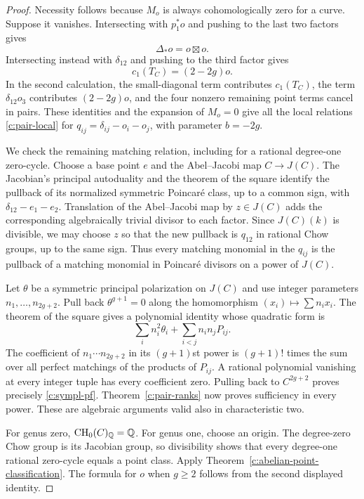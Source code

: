 \begin{proof}
Necessity follows because $M_o$ is always cohomologically zero for a curve. Suppose it vanishes. Intersecting with $p_1^*o$ and pushing to the last two factors gives
\[
 \Delta_*o=o\boxtimes o.
\]
Intersecting instead with $\delta_{12}$ and pushing to the third factor gives
\[
 c_1(T_C)=(2-2g)o.
\]
In the second calculation, the small-diagonal term contributes $c_1(T_C)$, the term $\delta_{12}o_3$ contributes $(2-2g)o$, and the four nonzero remaining point terms cancel in pairs. These identities and the expansion of $M_o=0$ give all the local relations \eqref{c:pair-local} for $q_{ij}=\delta_{ij}-o_i-o_j$, with parameter $b=-2g$.

We check the remaining matching relation, including for a rational degree-one zero-cycle. Choose a base point $e$ and the Abel--Jacobi map $C\to J(C)$. The Jacobian's principal autoduality and the theorem of the square identify the pullback of its normalized symmetric Poincar\'e class, up to a common sign, with $\delta_{12}-e_1-e_2$. Translation of the Abel--Jacobi map by $z\in J(C)$ adds the corresponding algebraically trivial divisor to each factor. Since $J(C)(k)$ is divisible, we may choose $z$ so that the new pullback is $q_{12}$ in rational Chow groups, up to the same sign. Thus every matching monomial in the $q_{ij}$ is the pullback of a matching monomial in Poincar\'e divisors on a power of $J(C)$.

Let $\theta$ be a symmetric principal polarization on $J(C)$ and use integer parameters $n_1,\ldots,n_{2g+2}$. Pull back $\theta^{g+1}=0$ along the homomorphism $(x_i)\mapsto\sum n_ix_i$. The theorem of the square gives a polynomial identity whose quadratic form is
\[
 \sum_i n_i^2\theta_i+\sum_{i<j}n_in_jP_{ij}.
\]
The coefficient of $n_1\cdots n_{2g+2}$ in its $(g+1)$st power is $(g+1)!$ times the sum over all perfect matchings of the products of $P_{ij}$. A rational polynomial vanishing at every integer tuple has every coefficient zero. Pulling back to $C^{2g+2}$ proves precisely \eqref{c:sympl-pf}. Theorem~\ref{c:pair-ranks} now proves sufficiency in every power. These are algebraic arguments valid also in characteristic two.

For genus zero, $\operatorname{CH}_0(C)_\mathbb Q=\mathbb Q$. For genus one, choose an origin. The degree-zero Chow group is its Jacobian group, so divisibility shows that every degree-one rational zero-cycle equals a point class. Apply Theorem~\ref{c:abelian-point-classification}. The formula for $o$ when $g\geq2$ follows from the second displayed identity.
\end{proof}

